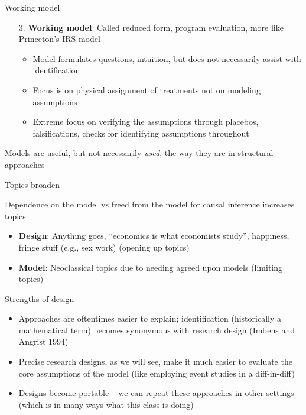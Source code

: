\documentclass{beamer}
\begin{document}
\begin{frame}{Working model}

  \begin{enumerate}
    \item[3. ] \textbf{Working model}: Called reduced form, program evaluation, more like Princeton's IRS model
          \begin{itemize}
            \item Model formulates questions, intuition, but does not necessarily assist with identification
            \item Focus is on physical assignment of treatments not on modeling assumptions
            \item Extreme focus on verifying the assumptions through placebos, falsifications, checks for identifying assumptions throughout
          \end{itemize}
  \end{enumerate}

  \bigskip

Models are useful, but not necessarily \emph{used}, the way they are in structural approaches

\end{frame}


\begin{frame}{Topics broaden}

  Dependence on the model vs freed from the model for causal inference increases topics
  \begin{itemize}
    \item \textbf{Design}: Anything goes, ``economics is what economists study'', happiness, fringe stuff (e.g., sex work) (opening up topics)
    \item \textbf{Model}: Neoclassical topics due to needing agreed upon models (limiting topics)
  \end{itemize}

\end{frame}

\begin{frame}{Strengths of design}

\begin{itemize}
\item Approaches are oftentimes easier to explain; identification (historically a mathematical term) becomes synonymous with research design (Imbens and Angrist 1994)
\item Precise research designs, as we will see, make it much easier to evaluate the core assumptions of the model (like employing event studies in a diff-in-diff)
\item Designs become portable -- we can repeat these approaches in other settings (which is in many ways what this class is doing)
\end{itemize}

\end{frame}
\end{document}
